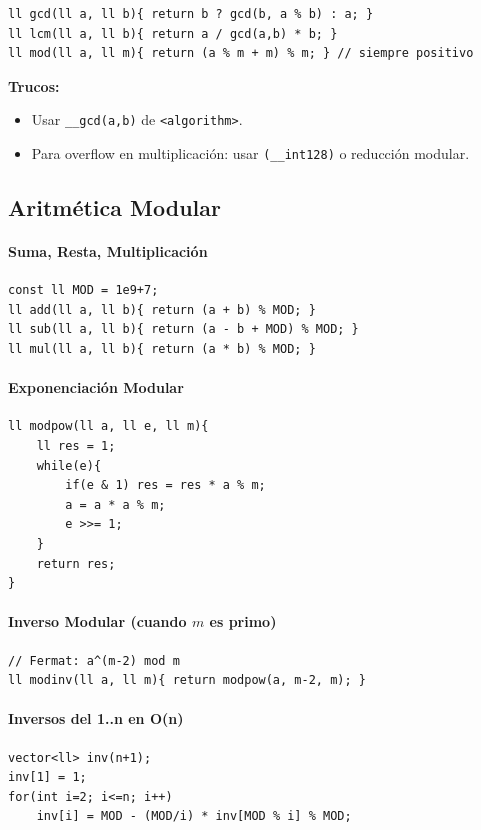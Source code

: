 \documentclass{article}
\begin{document}
\begin{lstlisting}[style=cppstyle]
ll gcd(ll a, ll b){ return b ? gcd(b, a % b) : a; }
ll lcm(ll a, ll b){ return a / gcd(a,b) * b; }
ll mod(ll a, ll m){ return (a % m + m) % m; } // siempre positivo
\end{lstlisting}

\textbf{Trucos:}
\begin{itemize}
  \item Usar \lstinline|__gcd(a,b)| de \lstinline|<algorithm>|.
  \item Para overflow en multiplicación: usar \lstinline|(__int128)| o reducción modular.
\end{itemize}


\subsection{Aritmética Modular}

\paragraph{Suma, Resta, Multiplicación}
\begin{lstlisting}[style=cppstyle]
const ll MOD = 1e9+7;
ll add(ll a, ll b){ return (a + b) % MOD; }
ll sub(ll a, ll b){ return (a - b + MOD) % MOD; }
ll mul(ll a, ll b){ return (a * b) % MOD; }
\end{lstlisting}

\paragraph{Exponenciación Modular}
\begin{lstlisting}[style=cppstyle]
ll modpow(ll a, ll e, ll m){
    ll res = 1;
    while(e){
        if(e & 1) res = res * a % m;
        a = a * a % m;
        e >>= 1;
    }
    return res;
}
\end{lstlisting}

\paragraph{Inverso Modular (cuando \(m\) es primo)}
\begin{lstlisting}[style=cppstyle]
// Fermat: a^(m-2) mod m
ll modinv(ll a, ll m){ return modpow(a, m-2, m); }
\end{lstlisting}

\paragraph{Inversos del 1..n en O(n)}
\begin{lstlisting}[style=cppstyle]
vector<ll> inv(n+1);
inv[1] = 1;
for(int i=2; i<=n; i++)
    inv[i] = MOD - (MOD/i) * inv[MOD % i] % MOD;
\end{lstlisting}
\end{document}
